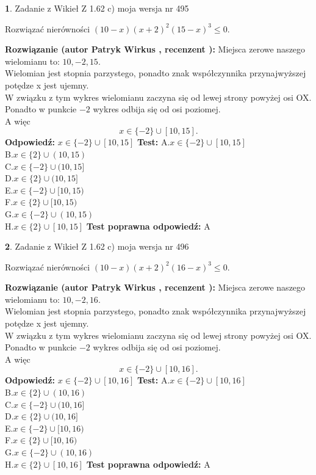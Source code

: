 \documentclass[12pt, a4paper]{article}
\theoremstyle{definition} %
\newtheorem{zad}{}
\newcommand{\zadStart}[1]{\begin{zad}#1\newline}
\newcommand{\zadStop}{\end{zad}}
\newcommand{\rozwStart}[2]{\noindent \textbf{Rozwiązanie (autor #1 , recenzent #2): }\newline}
\newcommand{\rozwStop}{\newline}
\newcommand{\odpStart}{\noindent \textbf{Odpowiedź:}\newline}
\newcommand{\odpStop}{\newline}
\newcommand{\testStart}{\noindent \textbf{Test:}\newline}
\newcommand{\testStop}{\newline}
\newcommand{\kluczStart}{\noindent \textbf{Test poprawna odpowiedź:}\newline}
\newcommand{\kluczStop}{\newline}
\begin{document}
\zadStart{Zadanie z Wikieł Z 1.62 c) moja wersja nr 495}

Rozwiązać nierówności $(10-x)(x+2)^{2}(15-x)^{3}\le0$.
\zadStop
\rozwStart{Patryk Wirkus}{}
Miejsca zerowe naszego wielomianu to: $10, -2, 15$.\\
Wielomian jest stopnia parzystego, ponadto znak współczynnika przy\linebreak najwyższej potędze x jest ujemny.\\ W związku z tym wykres wielomianu zaczyna się od lewej strony powyżej osi OX.\\
Ponadto w punkcie $-2$ wykres odbija się od osi poziomej.\\
A więc $$x \in \{-2\} \cup [10,15].$$
\rozwStop
\odpStart
$x \in \{-2\} \cup [10,15]$
\odpStop
\testStart
A.$x \in \{-2\} \cup [10,15]$\\
B.$x \in \{2\} \cup (10,15)$\\
C.$x \in \{-2\} \cup (10,15]$\\
D.$x \in \{2\} \cup (10,15]$\\
E.$x \in \{-2\} \cup [10,15)$\\
F.$x \in \{2\} \cup [10,15)$\\
G.$x \in \{-2\} \cup (10,15)$\\
H.$x \in \{2\} \cup [10,15]$
\testStop
\kluczStart
A
\kluczStop



\zadStart{Zadanie z Wikieł Z 1.62 c) moja wersja nr 496}

Rozwiązać nierówności $(10-x)(x+2)^{2}(16-x)^{3}\le0$.
\zadStop
\rozwStart{Patryk Wirkus}{}
Miejsca zerowe naszego wielomianu to: $10, -2, 16$.\\
Wielomian jest stopnia parzystego, ponadto znak współczynnika przy\linebreak najwyższej potędze x jest ujemny.\\ W związku z tym wykres wielomianu zaczyna się od lewej strony powyżej osi OX.\\
Ponadto w punkcie $-2$ wykres odbija się od osi poziomej.\\
A więc $$x \in \{-2\} \cup [10,16].$$
\rozwStop
\odpStart
$x \in \{-2\} \cup [10,16]$
\odpStop
\testStart
A.$x \in \{-2\} \cup [10,16]$\\
B.$x \in \{2\} \cup (10,16)$\\
C.$x \in \{-2\} \cup (10,16]$\\
D.$x \in \{2\} \cup (10,16]$\\
E.$x \in \{-2\} \cup [10,16)$\\
F.$x \in \{2\} \cup [10,16)$\\
G.$x \in \{-2\} \cup (10,16)$\\
H.$x \in \{2\} \cup [10,16]$
\testStop
\kluczStart
A
\kluczStop
\end{document}
